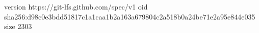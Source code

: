 version https://git-lfs.github.com/spec/v1
oid sha256:d98c0e3bdd51817c1a1caa1b2a163a679804c2a518b0a24be71e2a95e844e035
size 2303
